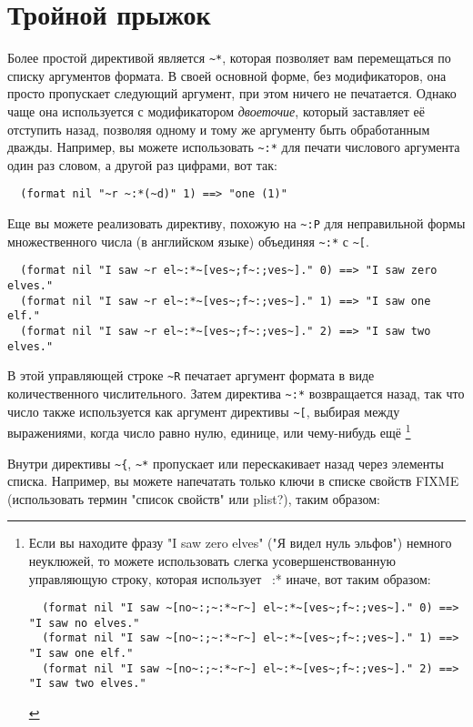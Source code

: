\section{Тройной прыжок}

Более простой директивой является \lstinline!~*!, которая позволяет вам перемещаться по
списку аргументов формата. В своей основной форме, без модификаторов, она просто
пропускает следующий аргумент, при этом ничего не печатается. Однако чаще она используется
с модификатором \textit{двоеточие}, который заставляет её отступить назад, позволяя одному
и тому же аргументу быть обработанным дважды. Например, вы можете использовать
\lstinline!~:*! для печати числового аргумента один раз словом, а другой раз цифрами, вот
так:

\begin{verbatim}
  (format nil "~r ~:*(~d)" 1) ==> "one (1)"
\end{verbatim}

Еще вы можете реализовать директиву, похожую на \lstinline!~:P! для неправильной формы множественного числа (в английском
языке) объединяя \lstinline!~:*! с \lstinline!~[!.

\begin{verbatim}
  (format nil "I saw ~r el~:*~[ves~;f~:;ves~]." 0) ==> "I saw zero elves."
  (format nil "I saw ~r el~:*~[ves~;f~:;ves~]." 1) ==> "I saw one elf."
  (format nil "I saw ~r el~:*~[ves~;f~:;ves~]." 2) ==> "I saw two elves."
\end{verbatim}

В этой управляющей строке \lstinline!~R! печатает аргумент формата в виде количественного числительного. Затем директива
\lstinline!~:*! возвращается назад, так что число также используется как аргумент директивы \lstinline!~[!, выбирая между
выражениями, когда число равно нулю, единице, или чему-нибудь ещё \footnote{Если вы находите фразу "I saw zero elves"
("Я видел нуль эльфов") немного неуклюжей, то можете использовать слегка усовершенствованную управляющую строку,
которая использует ~:* иначе, вот таким образом:

\begin{verbatim}
  (format nil "I saw ~[no~:;~:*~r~] el~:*~[ves~;f~:;ves~]." 0) ==> "I saw no elves."
  (format nil "I saw ~[no~:;~:*~r~] el~:*~[ves~;f~:;ves~]." 1) ==> "I saw one elf."
  (format nil "I saw ~[no~:;~:*~r~] el~:*~[ves~;f~:;ves~]." 2) ==> "I saw two elves."
\end{verbatim}

}

Внутри директивы \lstinline!~{!, \lstinline!~*! пропускает или перескакивает назад через элементы списка. Например, вы можете
напечатать только ключи в списке свойств FIXME (использовать термин "список свойств" или plist?), таким образом:

